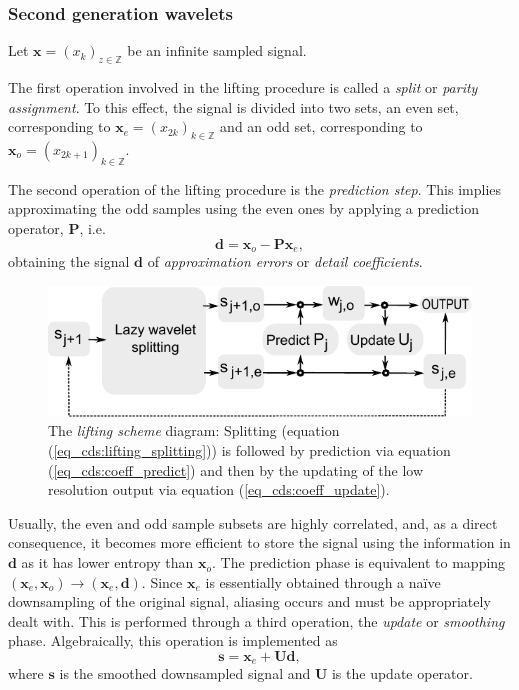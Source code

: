 \documentclass[graybox]{svmult}
\begin{document}
	
	\subsubsection{Second generation wavelets}
	Let $\mathbf{x} = (x_k)_{z\in \mathbb{Z}}$ be an infinite sampled signal.
	
	The first operation involved in the lifting procedure is called a \emph{split} or \emph{parity assignment}. To this effect, the signal is divided into two sets, an even set, corresponding to $\mathbf{x}_e = (x_{2k})_{k\in \mathbb{Z}}$ and an odd set, corresponding to $\mathbf{x}_o = (x_{2k+1})_{k\in\mathbb{Z}}$.
	
	The second operation of the lifting procedure is the \emph{prediction step}. This implies approximating the odd samples using the even ones by applying a prediction operator, $\mathbf{P}$, i.e.
	\begin{equation}
	\mathbf{d} = \mathbf{x}_o - \mathbf{P} \mathbf{x}_e,
	\end{equation}
	obtaining the signal $\mathbf{d}$ of \emph{approximation errors} or \emph{detail coefficients}.
	
	
	\begin{figure}[t]
		\centering
		\includegraphics[width=\textwidth]{lifting_diagram}
		\caption{The \emph{lifting scheme} diagram: Splitting (equation (\ref{eq_cds:lifting_splitting})) is followed by prediction via equation (\ref{eq_cds:coeff_predict}) and then by the updating of the low resolution output via equation (\ref{eq_cds:coeff_update}).}
		\label{fig_cds:lifting_diagram}
	\end{figure}
	
	
	Usually, the even and odd sample subsets are highly correlated, and, as a direct consequence, it becomes more efficient to store the signal using the information in $\mathbf{d}$ as it has lower entropy than $\mathbf{x}_o$. The prediction phase is equivalent to mapping $(\mathbf{x}_e, \mathbf{x}_o) \to (\mathbf{x}_e, \mathbf{d})$. Since $\mathbf{x}_e$ is essentially obtained through a na\"ive downsampling of the original signal, aliasing occurs and must be appropriately dealt with. This is performed through a third operation, the \emph{update} or \emph{smoothing} phase. Algebraically, this operation is implemented as
	\begin{equation}
	\mathbf{s} = \mathbf{x}_e + \mathbf{U}\mathbf{d},
	\end{equation}
	where $\mathbf{s}$ is the smoothed downsampled signal and $\mathbf{U}$ is the update operator. 
	
\end{document}
